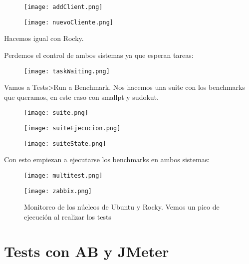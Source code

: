\begin{figure}[H]
	\centering
	\texttt{[image: addClient.png]}
\end{figure}

\begin{figure}[H]
	\centering
	\texttt{[image: nuevoCliente.png]}
\end{figure}

Hacemos igual con Rocky.

Perdemos el control de ambos sistemas ya que esperan tareas:
\begin{figure}[H]
	\centering
	\texttt{[image: taskWaiting.png]}
\end{figure}

Vamos a Tests>Run a Benchmark. Nos hacemos una suite con los benchmarks que queramos, en este caso con smallpt y sudokut.
\begin{figure}[H]
	\centering
	\texttt{[image: suite.png]}
\end{figure}

\begin{figure}[H]
	\centering
	\texttt{[image: suiteEjecucion.png]}
\end{figure}

\begin{figure}[H]
	\centering
	\texttt{[image: suiteState.png]}
\end{figure}
Con esto empiezan a ejecutarse los benchmarks en ambos sistemas:

\begin{figure}[H]
	\centering
	\texttt{[image: multitest.png]}
\end{figure}

\begin{figure}[H]
	\centering
	\texttt{[image: zabbix.png]}
	\caption{Monitoreo de los núcleos de Ubuntu y Rocky. Vemos un pico de ejecución al realizar los tests}
\end{figure}

\section{Tests con AB y JMeter}

